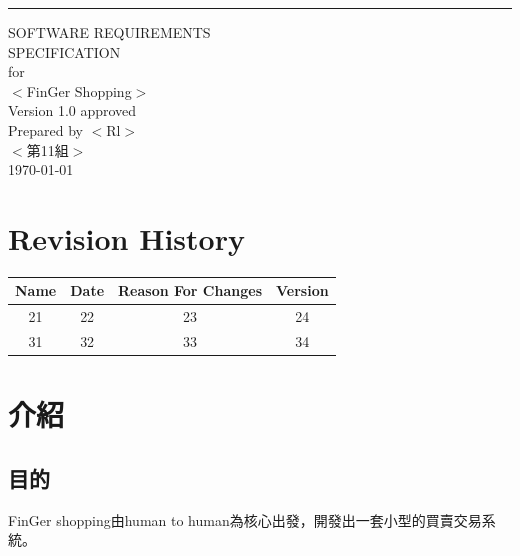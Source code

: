 \documentclass{scrreprt}
\date{}
\def\myversion{1.0 }
\begin{document}
\begin{CJK}{UTF8}{bkai}
\begin{flushright}
    \rule{16cm}{5pt}\vskip1cm
    \begin{bfseries}
        \Huge{SOFTWARE REQUIREMENTS\\ SPECIFICATION}\\
        \vspace{1.9cm}
        for\\
        \vspace{1.9cm}
        $<$FinGer Shopping$>$\\
        \vspace{1.9cm}
        \LARGE{Version \myversion approved}\\
        \vspace{1.9cm}
        Prepared by $<$Rl$>$\\
        \vspace{1.9cm}
        $<$第11組$>$\\
        \vspace{1.9cm}
        \today\\
    \end{bfseries}
\end{flushright}

\tableofcontents


\chapter*{Revision History}

\begin{center}
    \begin{tabular}{|c|c|c|c|}
        \hline
	    Name & Date & Reason For Changes & Version\\
        \hline
	    21 & 22 & 23 & 24\\
        \hline
	    31 & 32 & 33 & 34\\
        \hline
    \end{tabular}
\end{center}

\chapter{介紹}

\section{目的}
\qquad FinGer shopping由human to human為核心出發，開發出一套小型的買賣交易系統。


\end{CJK}
\end{document}
